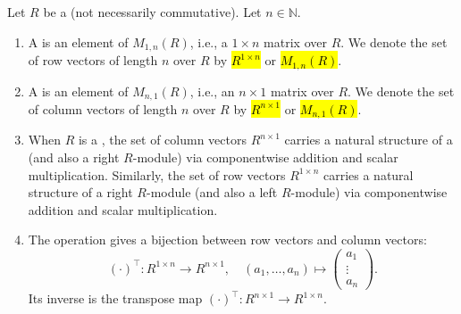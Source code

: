 \begin{definition} \label{definition:row_vector_and_column_vector_over_a_ring}
    Let $R$ be a  (not necessarily commutative).
    Let $n \in \mathbb{N}$.
    \begin{enumerate}
        \item A  is an element of $M_{1,n}(R)$, i.e., a $1 \times n$ matrix over $R$. We denote the set of row vectors of length $n$ over $R$ by \hl{$R^{1 \times n}$} or \hl{$M_{1,n}(R)$}.

        \item A  is an element of $M_{n,1}(R)$, i.e., an $n \times 1$ matrix over $R$. We denote the set of column vectors of length $n$ over $R$ by \hl{$R^{n \times 1}$} or \hl{$M_{n,1}(R)$}.

        \item When $R$ is a , the set of column vectors $R^{n \times 1}$ carries a natural structure of a  (and also a right $R$-module) via componentwise addition and scalar multiplication. Similarly, the set of row vectors $R^{1 \times n}$ carries a natural structure of a right $R$-module (and also a left $R$-module) via componentwise addition and scalar multiplication.

        \item The  operation gives a bijection between row vectors and column vectors:
        $$ (\cdot)^\top: R^{1 \times n} \to R^{n \times 1}, \quad (a_1, \ldots, a_n) \mapsto \begin{pmatrix} a_1 \\ \vdots \\ a_n \end{pmatrix}. $$
        Its inverse is the transpose map $(\cdot)^\top: R^{n \times 1} \to R^{1 \times n}$.
    \end{enumerate}
\end{definition}